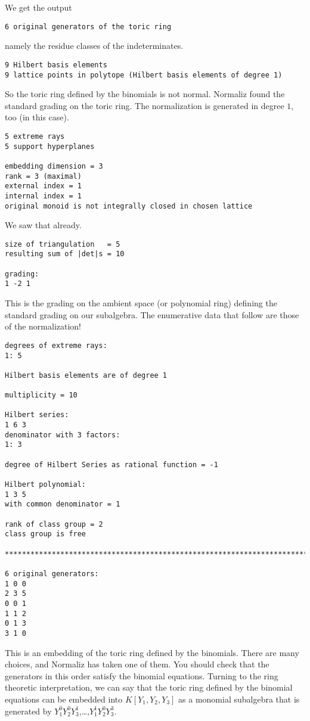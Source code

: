 \documentclass[12pt,a4paper]{scrartcl}
\theoremstyle{definition}
\begin{document}
We get the output
\begin{Verbatim}
6 original generators of the toric ring
\end{Verbatim}
namely the residue classes of the indeterminates.
\begin{Verbatim}
9 Hilbert basis elements
9 lattice points in polytope (Hilbert basis elements of degree 1)
\end{Verbatim}
So the toric ring defined by the binomials is not normal. Normaliz found the standard grading on the toric ring. The normalization is generated in degree $1$, too (in this case).
\begin{Verbatim}
5 extreme rays
5 support hyperplanes

embedding dimension = 3
rank = 3 (maximal)
external index = 1
internal index = 1
original monoid is not integrally closed in chosen lattice
\end{Verbatim}
We saw that already.
\begin{Verbatim}
size of triangulation   = 5
resulting sum of |det|s = 10

grading:
1 -2 1
\end{Verbatim}
This is the grading on the ambient space (or polynomial ring) defining the standard grading on our subalgebra. The enumerative data that follow are those of the normalization!
\begin{Verbatim}
degrees of extreme rays:
1: 5  

Hilbert basis elements are of degree 1

multiplicity = 10

Hilbert series:
1 6 3 
denominator with 3 factors:
1: 3  

degree of Hilbert Series as rational function = -1

Hilbert polynomial:
1 3 5 
with common denominator = 1

rank of class group = 2
class group is free

***********************************************************************

6 original generators:
1 0 0
2 3 5
0 0 1
1 1 2
0 1 3
3 1 0
\end{Verbatim}
This is an embedding of the toric ring defined by the binomials. There are many choices, and Normaliz has taken one of them. You should check that the generators in this order satisfy the binomial equations. Turning to the ring theoretic interpretation, we can say that the toric ring defined by the binomial equations can be embedded into $K[Y_1,Y_2,Y_3]$ as a monomial subalgebra that is generated by $Y_1^0Y_2^0Y_3^1$,\dots,$Y_1^1Y_2^0Y_3^3$.
\end{document}
